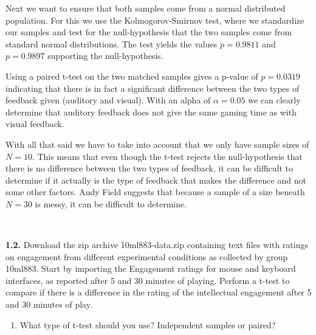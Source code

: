 Next we want to ensure that both samples come from a normal distributed population. For this we use the Kolmogorov-Smirnov test, where we standardize our samples and test for the null-hypothesis that the two samples come from standard normal distributions. The test yields the values $p=0.9811$ and $p=0.9897$ supporting the null-hypothesis.

Using a paired t-test on the two matched samples gives a p-value of $p=0.0319$ indicating that there is in fact a significant difference between the two types of feedback given (auditory and visual). With an alpha of $\alpha=0.05$ we can clearly determine that auditory feedback does not give the same gaming time as with visual feedback.

With all that said we have to take into account that we only have sample sizes of $N=10$. This means that even though the t-test rejects the null-hypothesis that there is no difference between the two types of feedback, it can be difficult to determine if it actually is the type of feedback that makes the difference and not some other factors. Andy Field \citep{Design} suggests that because a sample of a size beneath $N=30$ is messy, it can be difficult to determine.

\hspace{0pt} \\
\noindent\colorbox{light-gray}{\begin{minipage}{0.98\textwidth}
\textbf{1.2.} Download the zip archive 10ml883-data.zip containing text files with ratings on engagement from different experimental conditions as collected by group 10ml883. Start by importing the Engagement ratings for mouse and keyboard interfaces, as reported after 5 and 30 minutes of playing. Perform a t-test to compare if there is a difference in the rating of the intellectual engagement after 5 and 30 minutes of play.
\end{minipage}}

\noindent\colorbox{lighter-gray}{\begin{minipage}{0.98\textwidth}
\begin{enumerate}[label=\textbf{(\arabic*)}]\setcounter{enumi}{0}
	\item What type of t-test should you use? Independent samples or paired?
\end{enumerate}\end{minipage}}

